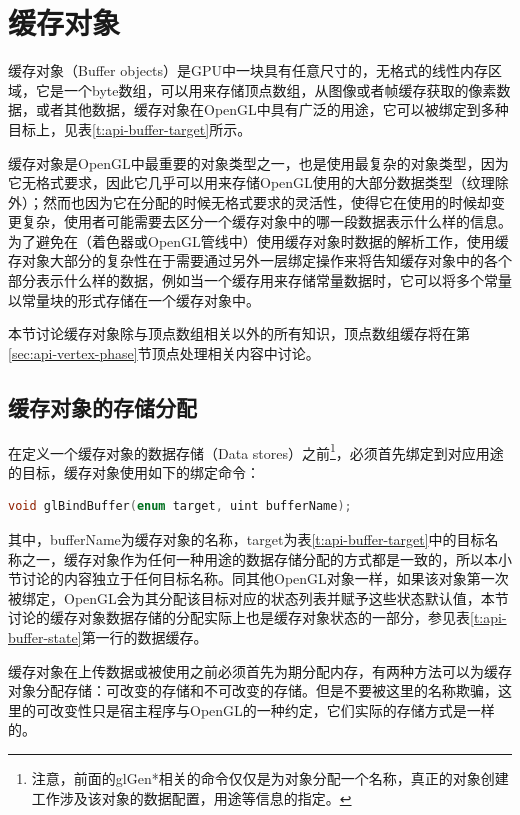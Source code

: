 \section{缓存对象}\label{sec:api-buffer-object}
缓存对象（Buffer objects）是GPU中一块具有任意尺寸的，无格式的线性内存区域，它是一个byte数组，可以用来存储顶点数组，从图像或者帧缓存获取的像素数据，或者其他数据，缓存对象在OpenGL中具有广泛的用途，它可以被绑定到多种目标上，见表\ref{t:api-buffer-target}所示。

缓存对象是OpenGL中最重要的对象类型之一，也是使用最复杂的对象类型，因为它无格式要求，因此它几乎可以用来存储OpenGL使用的大部分数据类型（纹理除外）；然而也因为它在分配的时候无格式要求的灵活性，使得它在使用的时候却变更复杂，使用者可能需要去区分一个缓存对象中的哪一段数据表示什么样的信息。为了避免在（着色器或OpenGL管线中）使用缓存对象时数据的解析工作，使用缓存对象大部分的复杂性在于需要通过另外一层绑定操作来将告知缓存对象中的各个部分表示什么样的数据，例如当一个缓存用来存储常量数据时，它可以将多个常量以常量块的形式存储在一个缓存对象中。

本节讨论缓存对象除与顶点数组相关以外的所有知识，顶点数组缓存将在第\ref{sec:api-vertex-phase}节顶点处理相关内容中讨论。




\subsection{缓存对象的存储分配}\label{sec:api-buffer-storage}
在定义一个缓存对象的数据存储（Data stores）之前\footnote{注意，前面的glGen*相关的命令仅仅是为对象分配一个名称，真正的对象创建工作涉及该对象的数据配置，用途等信息的指定。}，必须首先绑定到对应用途的目标，缓存对象使用如下的绑定命令：

\begin{lstlisting}[language=C++]
void glBindBuffer​(enum target, uint bufferName);
\end{lstlisting}

其中，bufferName为缓存对象的名称，target为表\ref{t:api-buffer-target}中的目标名称之一，缓存对象作为任何一种用途的数据存储分配的方式都是一致的，所以本小节讨论的内容独立于任何目标名称。同其他OpenGL对象一样，如果该对象第一次被绑定，OpenGL会为其分配该目标对应的状态列表并赋予这些状态默认值，本节讨论的缓存对象数据存储的分配实际上也是缓存对象状态的一部分，参见表\ref{t:api-buffer-state}第一行的数据缓存。

缓存对象在上传数据或被使用之前必须首先为期分配内存，有两种方法可以为缓存对象分配存储：可改变的存储和不可改变的存储。但是不要被这里的名称欺骗，这里的可改变性只是宿主程序与OpenGL的一种约定，它们实际的存储方式是一样的。



